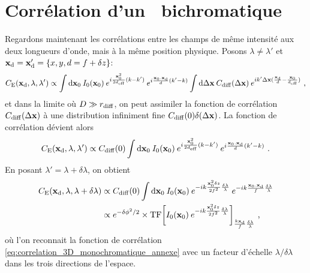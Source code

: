 \section{Corrélation d'un \speckle\ bichromatique}
Regardons maintenant les corrélations entre les champs de même intensité aux deux longueurs d'onde, mais à la même position physique. Posons $\lambda\neq\lambda'$ et $\mathbf{x}_{\mathrm{d}}=\mathbf{x}_{\mathrm{d}}'=\lbrace x,y,d=f+\delta z \rbrace$:
\begin{equation}
C_{\mathrm{E}}(\mathbf{x}_{\mathrm{d}},\lambda,\lambda') \propto \int{\mathop{}\mathopen{}\mathrm{d}\mathbf{x}_0\: I_0(\mathbf{x}_0) \: e^{i\frac{\mathbf{x}_0^2}{2d_{\mathrm{eff}}}(k-k')} \: e^{i\frac{\mathbf{x}_0.\mathbf{x}_{\mathrm{d}}}{d}(k'-k)} \int{\mathop{}\mathopen{}\mathrm{d}\Delta\mathbf{x}\: C_{\mathrm{diff}}(\Delta\mathbf{x}) \: e^{i k' \Delta\mathbf{x}(\frac{\mathbf{x}_{\mathrm{d}}}{d}-\frac{\mathbf{x}_0}{d_{\mathrm{eff}}})}}} \text{ ,}
\end{equation}
et dans la limite où $D\gg r_{\mathrm{diff}}$, on peut assimiler la fonction de corrélation $C_{\mathrm{diff}}(\Delta\mathbf{x})$  à une distribution infiniment fine $C_{\mathrm{diff}}(0) \delta(\Delta\mathbf{x})$. La fonction de corrélation dévient alors
\begin{equation}
C_{\mathrm{E}}(\mathbf{x}_{\mathrm{d}},\lambda,\lambda') \propto  C_{\mathrm{diff}}(0) \int{\mathop{}\mathopen{}\mathrm{d}\mathbf{x}_0\: I_0(\mathbf{x}_0) \: e^{i\frac{\mathbf{x}_0^2}{2d_{\mathrm{eff}}}(k-k')} \: e^{i\frac{\mathbf{x}_0.\mathbf{x}_{\mathrm{d}}}{d}(k'-k)}} \text{ .}
\end{equation}
En posant $\lambda'=\lambda+ \delta \lambda$, on obtient
\begin{align}
C_{\mathrm{E}}(\mathbf{x}_{\mathrm{d}},\lambda, \lambda+\delta\lambda) &\propto C_{\mathrm{diff}}(0) \int{\mathop{}\mathopen{}\mathrm{d}\mathbf{x}_0\: I_0(\mathbf{x}_0) \: e^{-ik \frac{\mathbf{x}_0^2 \delta z}{2f^2} \frac{\delta \lambda}{\lambda}} \: e^{-ik \frac{\mathbf{x}_0.\mathbf{x}_{\mathrm{d}}}{f}\frac{\delta \lambda}{\lambda}}} \\
& \propto e^{-\delta\phi^2/2} \times \mathrm{TF}{\left[ I_0(\mathbf{x}_0)\: e^{-ik\frac{\mathbf{x}_0^2 \delta z}{2f^2} \frac{\delta\lambda}{\lambda}} \right]}_{\frac{k \mathbf{x}_{\mathrm{d}}}{f}\frac{\delta \lambda}{\lambda}} \text{ ,}
\end{align}
où l'on reconnait la fonction de corrélation \ref{eq:correlation_3D_monochromatique_annexe} avec un facteur d'échelle $\lambda/\delta\lambda$ dans les trois directions de l'espace.






